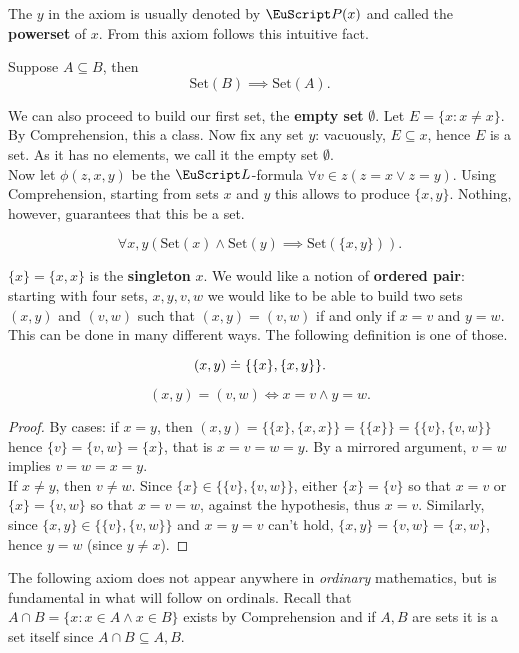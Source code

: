 \documentclass[twoside,openright,titlepage,numbers=noenddot,%
               headinclude,footinclude,cleardoublepage=empty,abstract=on,
               BCOR=23mm,paper=letter,fontsize=11pt
               ]{scrreprt}
\begin{document}
The $y$ in the axiom is usually denoted by $\P(x)$ and called the \textbf{powerset} of $x$.
From this axiom follows this intuitive fact.
\begin{proposition}
    Suppose $A \subseteq B$, then
    \[\mathrm{Set}(B) \implies \mathrm{Set}(A).\]
\end{proposition}
We can also proceed to build our first set, the \textbf{empty set} $\emptyset$. Let $E = \{ x: x \neq x \}$. By Comprehension, this a class. Now fix any set $y$: vacuously, $E \subseteq x$, hence $E$ is a set. As it has no elements, we call it the empty set $\emptyset$. \\
Now let $\phi(z,x,y)$ be the $\L$-formula $\forall v \in z(z = x \lor z = y)$. Using Comprehension, starting from sets $x$ and $y$ this allows to produce $\{x,y\}$. Nothing, however, guarantees that this be a set.
\begin{axiom}[Pairing]
    \[\forall x, y (\mathrm{Set}(x) \land \mathrm{Set}(y) \implies \mathrm{Set}(\{x,y\})).\]
\end{axiom}
$\{ x \} = \{x,x\}$ is the \textbf{singleton} $x$. We would like a notion of \textbf{ordered pair}: starting with four sets, $x, y, v, w$ we would like to be able to build two sets $(x,y)$ and $(v,w)$ such that $(x,y) = (v,w)$ if and only if $x = v$ and $y = w$. This can be done in many different ways. The following definition is one of those.
\begin{definition}
    \[ (x,y) \hskip1mm\dot{=}\hskip1mm \{\{x\}, \{x,y\}\}. \]
\end{definition}
\begin{proposition}
    \[ (x,y) = (v,w) \iff x = v \land y = w. \]
\end{proposition}
\begin{proof}
    By cases: if $x = y$, then $(x,y) = \{\{x\},\{x,x\}\} = \{\{x\}\} = \{\{v\},\{v,w\}\}$ hence $\{v\} = \{v,w\} = \{x\}$, that is $x = v = w = y$. By a mirrored argument, $v = w$ implies $v = w = x = y$.\\
    If $x \neq y$, then $v \neq w$. Since $\{x\} \in \{\{v\},\{v,w\}\}$, either $\{x \} = \{v\}$ so that $x = v$ or $\{x\} = \{v,w\}$ so that $x = v = w$, against the hypothesis, thus $x = v$. Similarly, since $\{x,y\} \in \{\{v\},\{v,w\}\}$ and $x = y = v$ can't hold, $\{x,y\} = \{v,w\} = \{x,w\}$, hence $y = w$ (since $y \neq x$). 
\end{proof}
The following axiom does not appear anywhere in \textit{ordinary} mathematics, but is fundamental in what will follow on ordinals. Recall that $A \cap B = \{x: x \in A \land x \in B\}$ exists by Comprehension and if $A,B$ are sets it is a set itself since $A \cap B \subseteq A,B$.
\end{document}
